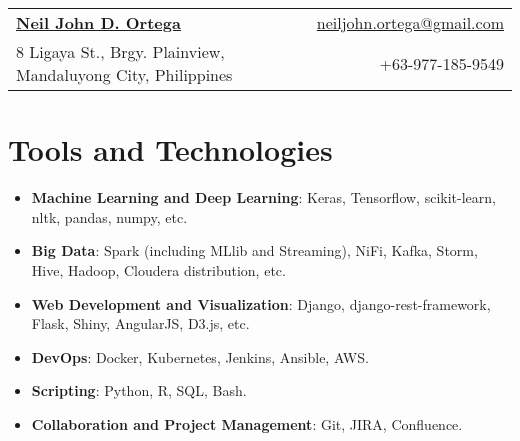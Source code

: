 \documentclass[letterpaper,11pt]{article}
\newcommand{\resumeItemInline}[2]{
  \item\small{
    \textbf{#1}{: #2 \vspace{-2pt}}
  }
}
\newcommand{\resumeSubItemInline}[2]{\resumeItemInline{#1}{#2}\vspace{-6pt}}
\newcommand{\resumeSubHeadingListStart}{\begin{itemize}[leftmargin=*]}
\newcommand{\resumeSubHeadingListEnd}{\end{itemize}\vspace{-5pt}}
\begin{document}
\begin{tabular*}{\textwidth}{l@{\extracolsep{\fill}}r}
  \textbf{\href{https://www.linkedin.com/in/neiljdo/}{\Large Neil John D. Ortega}} & \href{mailto:neiljohn.ortega@gmail.com}{neiljohn.ortega@gmail.com}\\
  8 Ligaya St., Brgy. Plainview, Mandaluyong City, Philippines & +63-977-185-9549\\
\end{tabular*}


\section{Tools and Technologies}
  \resumeSubHeadingListStart
    \resumeSubItemInline{Machine Learning and Deep Learning}
      {Keras, Tensorflow, scikit-learn, nltk, pandas, numpy, etc.}
    \resumeSubItemInline{Big Data}
      {Spark (including MLlib and Streaming), NiFi, Kafka, Storm, Hive, Hadoop, Cloudera distribution, etc.}
    \resumeSubItemInline{Web Development and Visualization}
      {Django, django-rest-framework, Flask, Shiny, AngularJS, D3.js, etc.}
    \resumeSubItemInline{DevOps}
      {Docker, Kubernetes, Jenkins, Ansible, AWS.}
    \resumeSubItemInline{Scripting}
      {Python, R, SQL, Bash.}
    \resumeSubItemInline{Collaboration and Project Management}
      {Git, JIRA, Confluence.}
  \resumeSubHeadingListEnd


\end{document}
